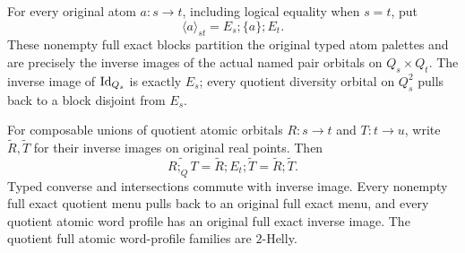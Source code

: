 \begin{lemma}
\label{lem:typed-simultaneous-blocks}
For every original atom $a:s\to t$, including logical equality
when $s=t$, put
\[
 \langle a\rangle_{st}=E_s;\{a\};E_t.
 \tag{TQ1}\label{eq:typed-exact-block}
\]
These nonempty full exact blocks partition the original typed
atom palettes and are precisely the inverse images of the actual
named pair orbitals on $Q_s\times Q_t$.  The inverse image of
$\mathrm{Id}_{Q_s}$ is exactly $E_s$; every quotient diversity orbital
on $Q_s^2$ pulls back to a block disjoint from $E_s$.

For composable unions of quotient atomic orbitals $R:s\to t$
and $T:t\to u$, write $\widetilde R,\widetilde T$ for their
inverse images on original real points. Then
\[
 \widetilde{R;_Q T}
 =\widetilde R;E_t;\widetilde T
 =\widetilde R;\widetilde T.
 \tag{TQ2}\label{eq:typed-exact-quotient-product}
\]
Typed converse and intersections commute with inverse image.
Every nonempty full exact quotient menu pulls back to an original
full exact menu, and every quotient atomic word profile has an
original full exact inverse image.  The quotient full atomic
word-profile families are $2$-Helly.
\end{lemma}
